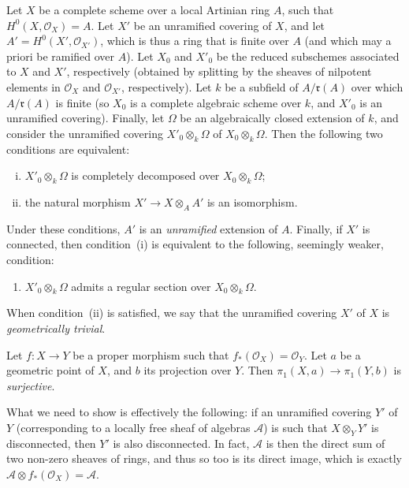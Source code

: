 \documentclass{article}
\theoremstyle{plain}
\newenvironment{lemma}[1]
  {\renewcommand\theinnercustomlemma{#1}\innercustomlemma}
  {\endinnercustomlemma}
\theoremstyle{definition}
\newcommand{\sh}[1]{{\mathscr{#1}}}
\newcommand{\fk}{\mathfrak}
\newcommand{\oldpage}[1]{\marginpar{\footnotesize$\Big\vert$ \textit{p.~#1}}}
\begin{document}
\begin{lemma}{3}
\label{lemma3}
  Let $X$ be a complete scheme over a local Artinian ring $A$, such that $H^0(X,\sh{O}_X)=A$.
  Let $X'$ be an unramified covering of $X$, and let $A'=H^0(X',\sh{O}_{X'})$, which is thus a ring that is finite over $A$ (and which may a priori be ramified over $A$).
  Let $X_0$ and $X'_0$ be the reduced subschemes associated to $X$ and $X'$, respectively (obtained by splitting by the sheaves of nilpotent elements in $\sh{O}_X$ and $\sh{O}_{X'}$, respectively).
  Let $k$ be a subfield of $A/\fk{r}(A)$ over which $A/\fk{r}(A)$ is finite (so $X_0$ is a complete algebraic scheme over $k$, and $X'_0$ is an unramified covering).
  Finally, let $\Omega$ be an algebraically closed extension of $k$, and consider the unramified covering $X'_0\otimes_k\Omega$ of $X_0\otimes_k\Omega$.
  Then the following two conditions are equivalent:
\oldpage{182-20}
  \begin{enumerate}[i.]
    \item $X'_0\otimes_k\Omega$ is completely decomposed over $X_0\otimes_k\Omega$;
    \item the natural morphism $X'\to X\otimes_AA'$ is an isomorphism.
  \end{enumerate}

  Under these conditions, $A'$ is an \emph{unramified} extension of $A$.
  Finally, if $X'$ is connected, then condition~(i) is equivalent to the following, seemingly weaker, condition:
  \begin{enumerate}[i bis.]
    \item $X'_0\otimes_k\Omega$ admits a regular section over $X_0\otimes_k\Omega$.
  \end{enumerate}
\end{lemma}

When condition~(ii) is satisfied, we say that the unramified covering $X'$ of $X$ is \emph{geometrically trivial}.

\begin{lemma}{4}
\label{lemma4}
  Let $f\colon X\to Y$ be a proper morphism such that $f_*(\sh{O}_X)=\sh{O}_Y$.
  Let $a$ be a geometric point of $X$, and $b$ its projection over $Y$.
  Then $\pi_1(X,a)\to\pi_1(Y,b)$ is \emph{surjective}.
\end{lemma}

What we need to show is effectively the following: if an unramified covering $Y'$ of $Y$ (corresponding to a locally free sheaf of algebras $\sh{A}$) is such that $X\otimes_YY'$ is disconnected, then $Y'$ is also disconnected.
In fact, $\sh{A}$ is then the direct sum of two non-zero sheaves of rings, and thus so too is its direct image, which is exactly $\sh{A}\otimes f_*(\sh{O}_X)=\sh{A}$.
\end{document}
